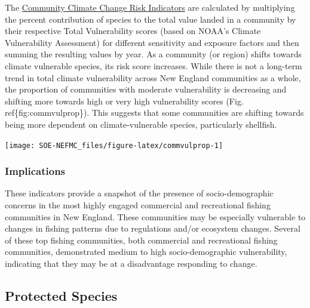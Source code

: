 \documentclass[
  10pt,
]{article}
\let\origfigure\figure
\let\endorigfigure\endfigure
\renewenvironment{figure}[1][2] {
    \expandafter\origfigure\expandafter[H]
} {
    \endorigfigure
}
\begin{document}
The \href{https://noaa-edab.github.io/catalog/community_climate_vulnerability.html}{Community Climate Change Risk Indicators} are calculated by multiplying the percent contribution of species to the total value landed in a community by their respective Total Vulnerability scores (based on NOAA's Climate Vulnerability Assessment) for different sensitivity and exposure factors and then summing the resulting values by year. As a community (or region) shifts towards climate vulnerable species, its risk score increases. While there is not a long-term trend in total climate vulnerability across New England communities as a whole, the proportion of communities with moderate vulnerability is decreasing and shifting more towards high or very high vulnerability scores (Fig. ref\{fig:commvulprop\}). This suggests that some communities are shifting towards being more dependent on climate-vulnerable species, particularly shellfish.

\begin{figure}

{\centering \texttt{[image: SOE-NEFMC\_files/figure-latex/commvulprop-1]} 

}

\caption{Proportion of New England communities at each revenue climate vulnerability level over time.}\label{fig:commvulprop}
\end{figure}

\hypertarget{implications-4}{%
\subsubsection{Implications}\label{implications-4}}

These indicators provide a snapshot of the presence of socio-demographic concerns in the most highly engaged commercial and recreational fishing communities in New England. These communities may be especially vulnerable to changes in fishing patterns due to regulations and/or ecosystem changes. Several of these top fishing communities, both commercial and recreational fishing communities, demonstrated medium to high socio-demographic vulnerability, indicating that they may be at a disadvantage responding to change.

\hypertarget{protected-species}{%
\subsection{Protected Species}\label{protected-species}}
\end{document}
